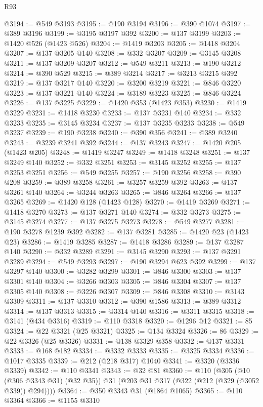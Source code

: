 \begin{lexlean}{R93}
\begin{coremodule}
@3194 := @549 @3193
@3195 := @190 @3194
@3196 := @390 @1074
@3197 := @389 @3196
@3199 := @3195 @3197 @392
@3200 := @137 @3199
@3203 := @1420 @526 (@1423 @526)
@3204 := @1419 @3203
@3205 := @1418 @3204
@3207 := @137 @3205 @140
@3208 := @332 @3207
@3209 := @3145 @3208
@3211 := @137 @3209 @3207
@3212 := @549 @3211
@3213 := @190 @3212
@3214 := @390 @529
@3215 := @389 @3214
@3217 := @3213 @3215 @392
@3219 := @137 @3217 @140
@3220 := @3200 @3219
@3221 := @846 @3220
@3223 := @137 @3221 @140
@3224 := @3189 @3223
@3225 := @846 @3224
@3226 := @137 @3225
@3229 := @1420 @353 (@1423 @353)
@3230 := @1419 @3229
@3231 := @1418 @3230
@3233 := @137 @3231 @140
@3234 := @332 @3233
@3235 := @3145 @3234
@3237 := @137 @3235 @3233
@3238 := @549 @3237
@3239 := @190 @3238
@3240 := @390 @356
@3241 := @389 @3240
@3243 := @3239 @3241 @392
@3244 := @137 @3243
@3247 := @1420 @205 (@1423 @205)
@3248 := @1419 @3247
@3249 := @1418 @3248
@3251 := @137 @3249 @140
@3252 := @332 @3251
@3253 := @3145 @3252
@3255 := @137 @3253 @3251
@3256 := @549 @3255
@3257 := @190 @3256
@3258 := @390 @208
@3259 := @389 @3258
@3261 := @3257 @3259 @392
@3263 := @137 @3261 @140
@3264 := @3244 @3263
@3265 := @846 @3264
@3266 := @137 @3265
@3269 := @1420 @128 (@1423 @128)
@3270 := @1419 @3269
@3271 := @1418 @3270
@3273 := @137 @3271 @140
@3274 := @332 @3273
@3275 := @3145 @3274
@3277 := @137 @3275 @3273
@3278 := @549 @3277
@3281 := @190 @3278 @1239 @392
@3282 := @137 @3281
@3285 := @1420 @23 (@1423 @23)
@3286 := @1419 @3285
@3287 := @1418 @3286
@3289 := @137 @3287 @140
@3290 := @332 @3289
@3291 := @3145 @3290
@3293 := @137 @3291 @3289
@3294 := @549 @3293
@3297 := @190 @3294 @623 @392
@3299 := @137 @3297 @140
@3300 := @3282 @3299
@3301 := @846 @3300
@3303 := @137 @3301 @140
@3304 := @3266 @3303
@3305 := @846 @3304
@3307 := @137 @3305 @140
@3308 := @3226 @3307
@3309 := @846 @3308
@3310 := @3143 @3309
@3311 := @137 @3310
@3312 := @390 @1586
@3313 := @389 @3312
@3314 := @137 @3313
@3315 := @3314 @140
@3316 := @3311 @3315
@3318 := @3141 (@434 @3316)
@3319 := @110 @3318
@3320 := @1296 @12
@3321 := 85
@3324 := @22 @3321 (@25 @3321)
@3325 := @134 @3324
@3326 := 86
@3329 := @22 @3326 (@25 @3326)
@3331 := @138 @3329 @358
@3332 := @137 @3331
@3333 := @168 @182
@3334 := @3332 @3333
@3335 := @3325 @3334
@3336 := @1017 @3335
@3339 := @212 (@218 @317) @1040
@3341 := @3320 (@3336 @3339)
@3342 := @110 @3341
@3343 := @32 @81
@3360 := @110
    (@305
      (@10 (@306 @3343 @31) (@32 @35))
      @31
      (@203 @31 @317 (@322 (@212 (@329 (@3052 @339)) @294))))
@3364 := @350 @3343 @31 (@1864 @1065)
@3365 := @110 @3364
@3366 := @1155 @3310

\end{coremodule}
\end{lexlean}
